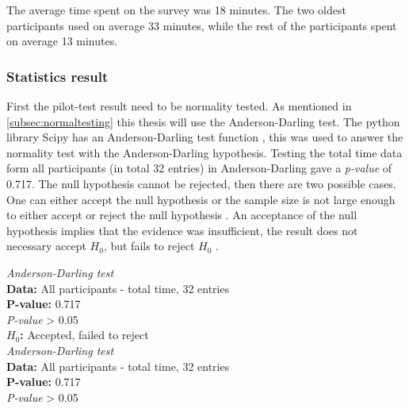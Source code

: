 The average time spent on the survey was 18 minutes. The two oldest participants used on average 33 minutes, while the rest of the participants spent on average 13 minutes. 


\subsubsection{Statistics result}
First the pilot-test result need to be normality tested. 
As mentioned in \ref{subsec:normaltesting} this thesis will use the Anderson-Darling test. The python library Scipy has an Anderson-Darling test function \citep{TheScipycommunity2017}, this was used to answer the normality test with the Anderson-Darling hypothesis. Testing the total time data form all participants (in total 32 entries) in Anderson-Darling gave a \textit{p-value} of 0.717. The null hypothesis cannot be rejected, then there are two possible cases. One can either accept the null hypothesis or the sample size is not large enough to either accept or reject the null hypothesis \citep{ThePennsylvaniaStateUniversity2017}. An acceptance of the null hypothesis implies that the evidence was insufficient, the result does not necessary accept $H_{0}$, but fails to reject $H_{0}$ \citep{Walpole2012}.  

\begin{framed}{\noindent\centering
\textit{Anderson-Darling test} \\
\textbf{Data:} All participants - total time, 32 entries\\
  \textbf{P-value:} 0.717  \\
    \textit{P-value} > 0.05\\
  \textbf{$H_{0}$:} Accepted, failed to reject \\
  \textit{Anderson-Darling test} \\
  \textbf{Data:} All participants - total time, 32 entries\\
  \textbf{P-value:} 0.717  \\
  \textit{P-value} > 0.05
  \par}
\end{framed}




